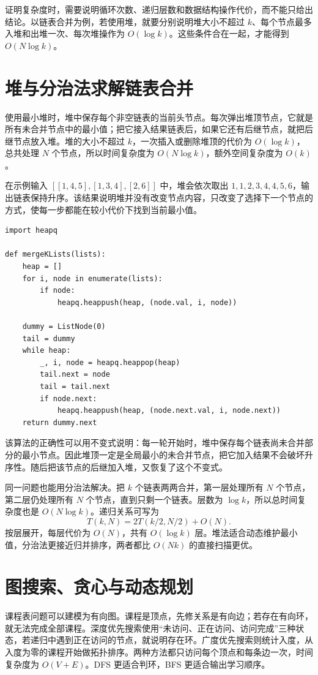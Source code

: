 \documentclass[UTF8,a4paper,12pt]{ctexart}
\begin{document}
证明复杂度时，需要说明循环次数、递归层数和数据结构操作代价，而不能只给出结论。以链表合并为例，若使用堆，就要分别说明堆大小不超过 $k$、每个节点最多入堆和出堆一次、每次堆操作为 $O(\log k)$。这些条件合在一起，才能得到 $O(N\log k)$。

\section{堆与分治法求解链表合并}

使用最小堆时，堆中保存每个非空链表的当前头节点。每次弹出堆顶节点，它就是所有未合并节点中的最小值；把它接入结果链表后，如果它还有后继节点，就把后继节点放入堆。堆的大小不超过 $k$，一次插入或删除堆顶的代价为 $O(\log k)$，总共处理 $N$ 个节点，所以时间复杂度为 $O(N\log k)$，额外空间复杂度为 $O(k)$。

在示例输入 $[[1,4,5],[1,3,4],[2,6]]$ 中，堆会依次取出 $1,1,2,3,4,4,5,6$，输出链表保持升序。该结果说明堆并没有改变节点内容，只改变了选择下一个节点的方式，使每一步都能在较小代价下找到当前最小值。

\begin{lstlisting}
import heapq

def mergeKLists(lists):
    heap = []
    for i, node in enumerate(lists):
        if node:
            heapq.heappush(heap, (node.val, i, node))

    dummy = ListNode(0)
    tail = dummy
    while heap:
        _, i, node = heapq.heappop(heap)
        tail.next = node
        tail = tail.next
        if node.next:
            heapq.heappush(heap, (node.next.val, i, node.next))
    return dummy.next
\end{lstlisting}

该算法的正确性可以用不变式说明：每一轮开始时，堆中保存每个链表尚未合并部分的最小节点。因此堆顶一定是全局最小的未合并节点，把它加入结果不会破坏升序性。随后把该节点的后继加入堆，又恢复了这个不变式。

同一问题也能用分治法解决。把 $k$ 个链表两两合并，第一层处理所有 $N$ 个节点，第二层仍处理所有 $N$ 个节点，直到只剩一个链表。层数为 $\log k$，所以总时间复杂度也是 $O(N\log k)$。递归关系可写为
\[
T(k,N)=2T(k/2,N/2)+O(N).
\]
按层展开，每层代价为 $O(N)$，共有 $O(\log k)$ 层。堆法适合动态维护最小值，分治法更接近归并排序，两者都比 $O(Nk)$ 的直接扫描更优。

\section{图搜索、贪心与动态规划}

课程表问题可以建模为有向图。课程是顶点，先修关系是有向边；若存在有向环，就无法完成全部课程。深度优先搜索使用“未访问、正在访问、访问完成”三种状态，若递归中遇到正在访问的节点，就说明存在环。广度优先搜索则统计入度，从入度为零的课程开始做拓扑排序。两种方法都只访问每个顶点和每条边一次，时间复杂度为 $O(V+E)$。DFS 更适合判环，BFS 更适合输出学习顺序。
\end{document}
